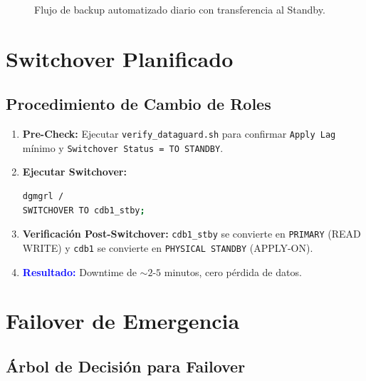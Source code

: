 \documentclass[11pt, a4paper]{report}
\newcommand{\destacado}[1]{\textbf{\textcolor{blue}{#1}}}
\begin{document}
\begin{figure}[htbp]
  \caption{Flujo de backup automatizado diario con transferencia al Standby.}
  \label{fig:backup_flow}
\end{figure}

\section{Switchover Planificado}

\subsection{Procedimiento de Cambio de Roles}
\begin{enumerate}
    \item \textbf{Pre-Check:} Ejecutar \texttt{verify\_dataguard.sh} para confirmar \texttt{Apply Lag} mínimo y \texttt{Switchover Status = TO STANDBY}.
\item \textbf{Ejecutar Switchover:}
        \begin{lstlisting}[language=bash, caption={Comando de Switchover con DGMGRL}]
dgmgrl /
SWITCHOVER TO cdb1_stby;
\end{lstlisting}
    \item \textbf{Verificación Post-Switchover:} \texttt{cdb1\_stby} se convierte en \texttt{PRIMARY} (READ WRITE) y \texttt{cdb1} se convierte en \texttt{PHYSICAL STANDBY} (APPLY-ON).
\item \destacado{Resultado:} Downtime de $\sim 2$-$5$ minutos, cero pérdida de datos.
\end{enumerate}

\section{Failover de Emergencia}

\subsection{Árbol de Decisión para Failover}
\end{document}
